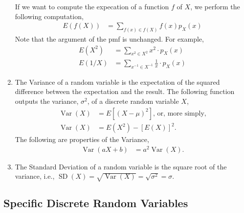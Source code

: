 \documentclass{amsproc}
\DeclareMathOperator{\Var}{\text{Var}}
\DeclareMathOperator{\SD}{\text{SD}}
\begin{document}
\begin{enumerate}
				If we want to compute the expecation of a function $f$ of $X$, we perform the following computation,
					\begin{align*}
						E\left( f(X) \right) &= \sum\limits_{f(x) \in f(X)} f(x) p_{X}(x)
					\end{align*}
				Note that the argument of the pmf is unchanged. For example,
					\begin{align*}
						E\left(X^{2}\right) &= \sum\limits_{x^{2} \in X^{2}} x^{2} \cdot p_{X}(x) \\
						E\left(1/X\right) &= \sum\limits_{x^{-1} \in X^{-1}} \frac{1}{x} \cdot p_{X}(x)
					\end{align*}

				\item The Variance of a random variable is the expectation of the squared difference between the expectation and the result. The following function outputs the variance, $\sigma^{2}$, of a discrete random variable $X$,
					\begin{align*}
						\Var(X) &= E\left[\left(X - \mu\right)^{2}\right]\text{, or, more simply,} \\
						\Var(X) &= E(X^{2}) - \left[E(X)\right]^{2}.
					\end{align*}
				The following are properties of the Variance,
					\begin{align*}
						\Var(aX + b) &= a^{2}\Var(X).
					\end{align*}

				\item The Standard Deviation of a random variable is the square root of the variance, i.e., $\SD(X) = \sqrt{\Var(X)} = \sqrt{\sigma^{2}} = \sigma$.
			\end{enumerate}

		\subsection{Specific Discrete Random Variables}
\end{document}
